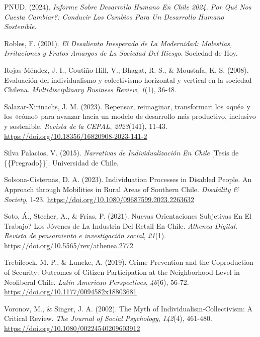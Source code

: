 \documentclass[
  12pt,
  letterpaper,
  DIV=11,
  numbers=noendperiod]{scrartcl}
\newlength{\cslhangindent}
\newenvironment{CSLReferences}[2] %
 {\begin{list}{}{%
  \setlength{\itemindent}{0pt}
  \setlength{\leftmargin}{0pt}
  \setlength{\parsep}{0pt}
  \ifodd #1
   \setlength{\leftmargin}{\cslhangindent}
   \setlength{\itemindent}{-1\cslhangindent}
  \fi
  \setlength{\itemsep}{#2\baselineskip}}}
 {\end{list}}
\begin{document}
\begin{CSLReferences}{1}{0}
PNUD. (2024). \emph{Informe Sobre {Desarrollo Humano} En {Chile} 2024.
{\textquestiondown}{Por} Qu{é} Nos Cuesta Cambiar?: Conducir Los Cambios
Para Un {Desarrollo Humano Sostenible}}.

Robles, F. (2001). \emph{El Desaliento Inesperado de La Modernidad:
{Molestias}, Irritaciones y Frutos Amargos de La Sociedad Del Riesgo}.
Sociedad de Hoy.

Rojas-Méndez, J. I., Coutiño-Hill, V., Bhagat, R. S., \& Moustafa, K. S.
(2008). {Evaluaci{ó}n del individualismo y colectivismo horizontal y
vertical en la sociedad Chilena.} \emph{Multidisciplinary Business
Review}, \emph{1}(1), 36-48.

Salazar-Xirinachs, J. M. (2023). {Repensar, reimaginar, transformar: los
{«qu{é}»} y los {«c{ó}mo»} para avanzar hacia un modelo de desarrollo
m{á}s productivo, inclusivo y sostenible}. \emph{Revista de la CEPAL},
\emph{2023}(141), 11-43.
\url{https://doi.org/10.18356/16820908-2023-141-2}

Silva Palacios, V. (2015). \emph{Narrativas de {Individualizaci{ó}n} En
{Chile}} {[}Tesis de \{\{Pregrado\}\}{]}. Universidad de Chile.

Solsona-Cisternas, D. A. (2023). Individuation Processes in Disabled
People. {An} Approach through Mobilities in Rural Areas of Southern
{Chile}. \emph{Disability \& Society}, 1-23.
\url{https://doi.org/10.1080/09687599.2023.2263632}

Soto, Á., Stecher, A., \& Frías, P. (2021). {\textquestiondown}{Nuevas}
Orientaciones Subjetivas En El Trabajo? {Los} J{ó}venes de La Industria
Del Retail En {Chile}. \emph{Athenea Digital. Revista de pensamiento e
investigaci{ó}n social}, \emph{21}(1).
\url{https://doi.org/10.5565/rev/athenea.2772}

Trebilcock, M. P., \& Luneke, A. (2019). Crime {Prevention} and the
{Coproduction} of {Security}: {Outcomes} of {Citizen Participation} at
the {Neighborhood Level} in {Neoliberal Chile}. \emph{Latin American
Perspectives}, \emph{46}(6), 56-72.
\url{https://doi.org/10.1177/0094582x18803681}

Voronov, M., \& Singer, J. A. (2002). The {Myth} of
{Individualism-Collectivism}: {A Critical Review}. \emph{The Journal of
Social Psychology}, \emph{142}(4), 461-480.
\url{https://doi.org/10.1080/00224540209603912}


\end{CSLReferences}
\end{document}
